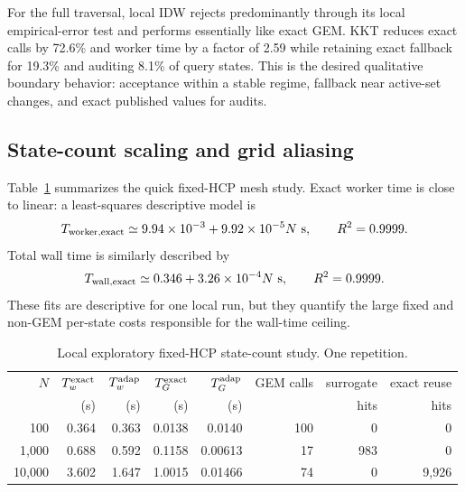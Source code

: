 \documentclass[11pt]{article}
\begin{document}
For the full traversal, local IDW rejects predominantly through its local empirical-error test and
performs essentially like exact GEM.  KKT reduces exact calls by 72.6\% and worker time by a factor
of 2.59 while retaining exact fallback for 19.3\% and auditing 8.1\% of query states.  This is the
desired qualitative boundary behavior: acceptance within a stable regime, fallback near active-set
changes, and exact published values for audits.

\subsection{State-count scaling and grid aliasing}

Table~\ref{tab:mesh-scaling} summarizes the quick fixed-HCP mesh study.  Exact worker time is close
to linear: a least-squares descriptive model is
\begin{equation}
  T_{\mathrm{worker,exact}}\simeq
  9.94\times10^{-3}+9.92\times10^{-5}N\ {\rm s},
  \qquad R^2=0.9999.
\end{equation}
Total wall time is similarly described by
\begin{equation}
  T_{\mathrm{wall,exact}}\simeq
  0.346+3.26\times10^{-4}N\ {\rm s},
  \qquad R^2=0.9999.
\end{equation}
These fits are descriptive for one local run, but they quantify the large fixed and non-GEM
per-state costs responsible for the wall-time ceiling.

\begin{table}[htbp]
  \centering
  \caption{Local exploratory fixed-HCP state-count study.  One repetition.}
  \label{tab:mesh-scaling}
  \small
  \begin{tabular}{rrrrrrrr}
    \toprule
    \(N\) & \(T_w^{\rm exact}\) & \(T_w^{\rm adap}\) &
    \(T_G^{\rm exact}\) & \(T_G^{\rm adap}\) &
    GEM calls & surrogate & exact reuse \\
    & (s) & (s) & (s) & (s) & & hits & hits \\
    \midrule
    100 & 0.364 & 0.363 & 0.0138 & 0.0140 & 100 & 0 & 0 \\
    1,000 & 0.688 & 0.592 & 0.1158 & 0.00613 & 17 & 983 & 0 \\
    10,000 & 3.602 & 1.647 & 1.0015 & 0.01466 & 74 & 0 & 9,926 \\
    \bottomrule
  \end{tabular}
\end{table}
\end{document}
